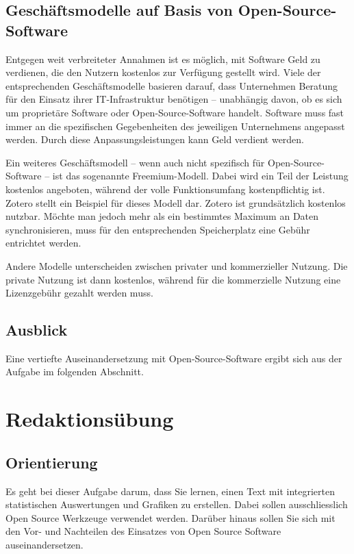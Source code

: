 \documentclass[
  nswissgerman,
  a4paper,
  DIV=11,
  numbers=noendperiod,
  ngerman]{scrreprt}
\begin{document}
\section{Geschäftsmodelle auf Basis von
Open-Source-Software}\label{geschuxe4ftsmodelle-auf-basis-von-open-source-software}

Entgegen weit verbreiteter Annahmen ist es möglich, mit Software Geld zu
verdienen, die den Nutzern kostenlos zur Verfügung gestellt wird. Viele
der entsprechenden Geschäftsmodelle basieren darauf, dass Unternehmen
Beratung für den Einsatz ihrer IT-Infrastruktur benötigen -- unabhängig
davon, ob es sich um proprietäre Software oder Open-Source-Software
handelt. Software muss fast immer an die spezifischen Gegebenheiten des
jeweiligen Unternehmens angepasst werden. Durch diese
Anpassungsleistungen kann Geld verdient werden.

Ein weiteres Geschäftsmodell -- wenn auch nicht spezifisch für
Open-Source-Software -- ist das sogenannte Freemium-Modell. Dabei wird
ein Teil der Leistung kostenlos angeboten, während der volle
Funktionsumfang kostenpflichtig ist. Zotero stellt ein Beispiel für
dieses Modell dar. Zotero ist grundsätzlich kostenlos nutzbar. Möchte
man jedoch mehr als ein bestimmtes Maximum an Daten synchronisieren,
muss für den entsprechenden Speicherplatz eine Gebühr entrichtet werden.

Andere Modelle unterscheiden zwischen privater und kommerzieller
Nutzung. Die private Nutzung ist dann kostenlos, während für die
kommerzielle Nutzung eine Lizenzgebühr gezahlt werden muss.

\section{Ausblick}\label{ausblick}

Eine vertiefte Auseinandersetzung mit Open-Source-Software ergibt sich
aus der Aufgabe im folgenden Abschnitt.

\chapter{Redaktionsübung}\label{redaktionsuxfcbung}

\section{Orientierung}\label{orientierung}

Es geht bei dieser Aufgabe darum, dass Sie lernen, einen Text mit
integrierten statistischen Auswertungen und Grafiken zu erstellen. Dabei
sollen ausschliesslich Open Source Werkzeuge verwendet werden. Darüber
hinaus sollen Sie sich mit den Vor- und Nachteilen des Einsatzes von
Open Source Software auseinandersetzen.
\end{document}
